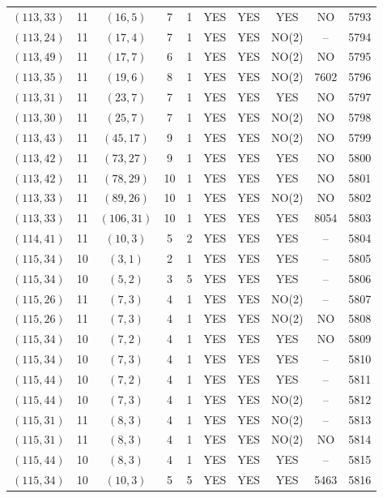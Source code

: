 \begin{longtable}{|c|c|c|c|c|c|c|c|c|c|}
$(113, 33)$ & 11 & $(16, 5)$ & 7 & 1 & YES & YES & YES & NO & 5793\\
$(113, 24)$ & 11 & $(17, 4)$ & 7 & 1 & YES & YES & NO(2) & -- & 5794\\
$(113, 49)$ & 11 & $(17, 7)$ & 6 & 1 & YES & YES & NO(2) & NO & 5795\\
$(113, 35)$ & 11 & $(19, 6)$ & 8 & 1 & YES & YES & NO(2) & 7602 & 5796\\
$(113, 31)$ & 11 & $(23, 7)$ & 7 & 1 & YES & YES & YES & NO & 5797\\
$(113, 30)$ & 11 & $(25, 7)$ & 7 & 1 & YES & YES & NO(2) & NO & 5798\\
$(113, 43)$ & 11 & $(45, 17)$ & 9 & 1 & YES & YES & NO(2) & NO & 5799\\
$(113, 42)$ & 11 & $(73, 27)$ & 9 & 1 & YES & YES & YES & NO & 5800\\
$(113, 42)$ & 11 & $(78, 29)$ & 10 & 1 & YES & YES & YES & NO & 5801\\
$(113, 33)$ & 11 & $(89, 26)$ & 10 & 1 & YES & YES & NO(2) & NO & 5802\\
$(113, 33)$ & 11 & $(106, 31)$ & 10 & 1 & YES & YES & YES & 8054 & 5803\\
$(114, 41)$ & 11 & $(10, 3)$ & 5 & 2 & YES & YES & YES & -- & 5804\\
$(115, 34)$ & 10 & $(3, 1)$ & 2 & 1 & YES & YES & YES & -- & 5805\\
$(115, 34)$ & 10 & $(5, 2)$ & 3 & 5 & YES & YES & YES & -- & 5806\\
$(115, 26)$ & 11 & $(7, 3)$ & 4 & 1 & YES & YES & NO(2) & -- & 5807\\
$(115, 26)$ & 11 & $(7, 3)$ & 4 & 1 & YES & YES & NO(2) & NO & 5808\\
$(115, 34)$ & 10 & $(7, 2)$ & 4 & 1 & YES & YES & YES & NO & 5809\\
$(115, 34)$ & 10 & $(7, 3)$ & 4 & 1 & YES & YES & YES & -- & 5810\\
$(115, 44)$ & 10 & $(7, 2)$ & 4 & 1 & YES & YES & YES & -- & 5811\\
$(115, 44)$ & 10 & $(7, 3)$ & 4 & 1 & YES & YES & NO(2) & -- & 5812\\
$(115, 31)$ & 11 & $(8, 3)$ & 4 & 1 & YES & YES & NO(2) & -- & 5813\\
$(115, 31)$ & 11 & $(8, 3)$ & 4 & 1 & YES & YES & NO(2) & NO & 5814\\
$(115, 44)$ & 10 & $(8, 3)$ & 4 & 1 & YES & YES & YES & -- & 5815\\
$(115, 34)$ & 10 & $(10, 3)$ & 5 & 5 & YES & YES & YES & 5463 & 5816\\

\end{longtable}
